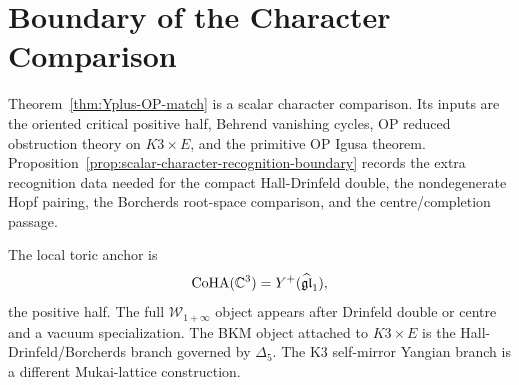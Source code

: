 \section{Boundary of the Character Comparison}
\label{sec:global-Yplus-character-boundary}

Theorem~\ref{thm:Yplus-OP-match} is a scalar character comparison. Its
inputs are the oriented critical positive half, Behrend vanishing
cycles, OP reduced obstruction theory on \(K3\times E\), and the
primitive OP Igusa theorem.
Proposition~\ref{prop:scalar-character-recognition-boundary} records
the extra recognition data needed for the compact Hall-Drinfeld double,
the nondegenerate Hopf pairing, the Borcherds root-space comparison, and
the centre/completion passage.

The local toric anchor is
\[
  \mathrm{CoHA}(\mathbb{C}^3)=Y^+(\widehat{\mathfrak{gl}}_1),
\]
the positive half. The full \(\mathcal W_{1+\infty}\) object appears
after Drinfeld double or centre and a vacuum specialization. The BKM
object attached to \(K3\times E\) is the Hall-Drinfeld/Borcherds branch
governed by \(\Delta_5\). The K3 self-mirror Yangian branch is a
different Mukai-lattice construction.
